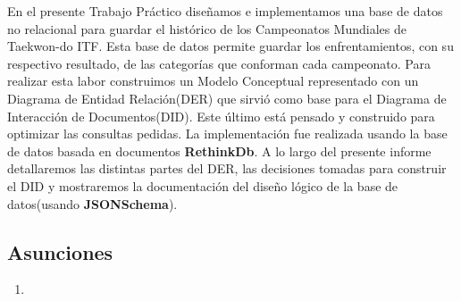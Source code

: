 En el presente Trabajo Práctico diseñamos e implementamos una base de datos no relacional para guardar el histórico de los
Campeonatos Mundiales de Taekwon-do ITF. Esta base de datos permite guardar los enfrentamientos, con su respectivo
resultado, de las categorías que conforman cada campeonato. Para realizar esta labor construimos un Modelo Conceptual representado con un
Diagrama de Entidad Relación(DER) que sirvió como base para el Diagrama de Interacción de Documentos(DID). Este último está
pensado y construido para optimizar las consultas pedidas. La implementación fue realizada usando la base de datos basada
en documentos \textbf{RethinkDb}. A lo largo del presente informe detallaremos las distintas partes del DER, las decisiones
tomadas para construir el DID y mostraremos la documentación del diseño lógico de la base de datos(usando \textbf{JSONSchema}).

\subsection{Asunciones}
\begin{enumerate}
\item
\end{enumerate}
